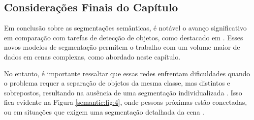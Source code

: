 \subsection{Considerações Finais do Capítulo}
\label{semantic:conclusion}
Em conclusão sobre as segmentações semânticas, é notável o avanço significativo em comparação com tarefas de detecção de objetos, como destacado em \cite{Vaillant1994}. Esses novos modelos de segmentação permitem o trabalho com um volume maior de dados em cenas complexas, como abordado neste capítulo.

No entanto, é importante ressaltar que essas redes enfrentam dificuldades quando o problema requer a separação de objetos da mesma classe, mas distintos e sobrepostos, resultando na ausência de uma segmentação individualizada \citep{Kirillov2019a}. Isso fica evidente na Figura \ref{semantic:fig:4}, onde pessoas próximas estão conectadas, ou em situações que exigem uma segmentação detalhada da cena \citep{Ghosh2019}.

